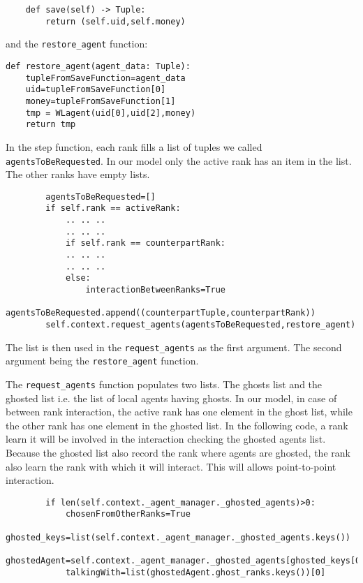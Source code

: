 \documentclass{article}
\begin{document}
\begin{verbatim}
    def save(self) -> Tuple:
        return (self.uid,self.money)
\end{verbatim}

and the \verb+restore_agent+ function:

\begin{verbatim}
def restore_agent(agent_data: Tuple):
    tupleFromSaveFunction=agent_data
    uid=tupleFromSaveFunction[0]
    money=tupleFromSaveFunction[1]
    tmp = WLagent(uid[0],uid[2],money)
    return tmp
\end{verbatim}


In the step function, each rank fills a list of tuples we called \verb+agentsToBeRequested+.
In our model only the active rank has an item in the list. The other ranks have empty lists.

\begin{verbatim}
        agentsToBeRequested=[]
        if self.rank == activeRank:
            .. .. ..
            .. .. ..
            if self.rank == counterpartRank:
            .. .. ..
            .. .. ..
            else:
                interactionBetweenRanks=True
                agentsToBeRequested.append((counterpartTuple,counterpartRank))
        self.context.request_agents(agentsToBeRequested,restore_agent)
\end{verbatim}
The list is then used in the \verb+request_agents+ as the first argument. The second argument being the \verb+restore_agent+ function.

The \verb+request_agents+ function populates two lists. The ghosts list and the ghosted list i.e. the list of local agents having ghosts. 
In our model, in case of between rank interaction, the active rank has one element in the ghost list, while the other rank has one element in the ghosted list.
In the following code, a rank learn it will be involved in the interaction checking the ghosted agents list. Because the ghosted list also record the rank where agents are ghosted, the rank also learn the rank with which it will interact. This will allows point-to-point interaction.

\begin{verbatim}
        if len(self.context._agent_manager._ghosted_agents)>0:
            chosenFromOtherRanks=True
            ghosted_keys=list(self.context._agent_manager._ghosted_agents.keys())
            ghostedAgent=self.context._agent_manager._ghosted_agents[ghosted_keys[0]]
            talkingWith=list(ghostedAgent.ghost_ranks.keys())[0]
\end{verbatim}
\end{document}
